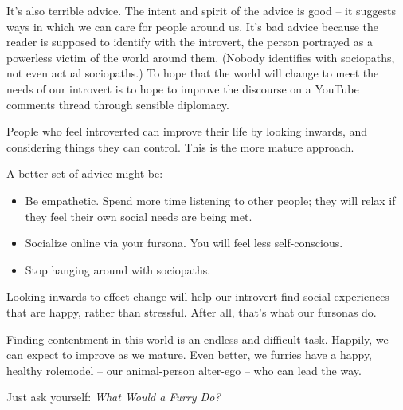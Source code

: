 It's also terrible advice. The intent and spirit of the advice is good -- it suggests ways in which we can care for people around us. It's bad advice because the reader is supposed to identify with the introvert, the person portrayed as a powerless victim of the world around them. (Nobody identifies with sociopaths, not even actual sociopaths.) To hope that the world will change to meet the needs of our introvert is to hope to improve the discourse on a YouTube comments thread through sensible diplomacy.

People who feel introverted can improve their life by looking inwards, and considering things they can control. This is the more mature approach.

A better set of advice might be:

\begin{itemize}
  \item Be empathetic. Spend more time listening to other people; they will relax if they feel their own social needs are being met.
  \item Socialize online via your fursona. You will feel less self-conscious.
  \item Stop hanging around with sociopaths.
\end{itemize}

Looking inwards to effect change will help our introvert find social experiences that are happy, rather than stressful. After all, that's what our fursonas do.

Finding contentment in this world is an endless and difficult task. Happily, we can expect to improve as we mature. Even better, we furries have a happy, healthy rolemodel -- our animal-person alter-ego -- who can lead the way.

Just ask yourself: \textit{What Would a Furry Do?}
